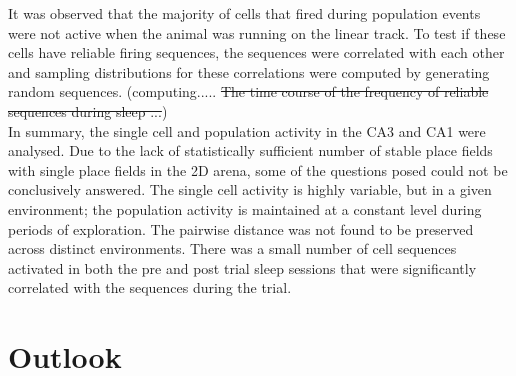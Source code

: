It was observed that the majority of cells that fired during population events were not active when the animal was running on the linear track. To test if these cells have reliable firing sequences, the sequences were correlated with each other and sampling distributions for these correlations were computed by generating random sequences. (computing..... \st{The time course of the frequency of reliable sequences during sleep ...})\\

In summary, the single cell and population activity in the CA3 and CA1 were analysed. Due to the lack of statistically sufficient number of stable place fields with single place fields in the 2D arena, some of the questions posed could not be conclusively answered. The single cell activity is highly variable, but in a given environment; the population activity is maintained at a constant level during periods of exploration. The pairwise distance was not found to be preserved across distinct environments.  There was a small number of cell sequences activated in both the pre and post trial sleep sessions that were significantly correlated with the sequences during the trial. 

\section*{Outlook}




